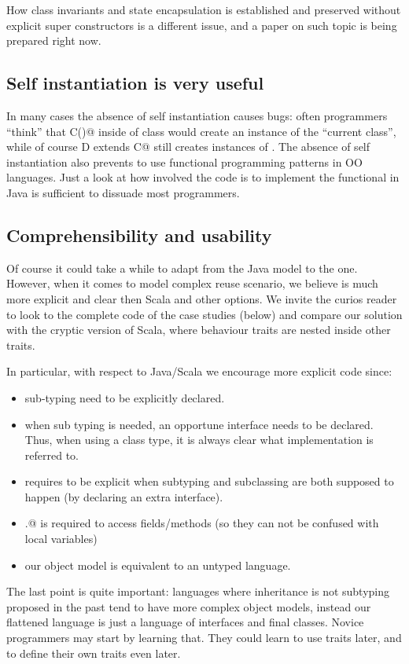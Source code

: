 How class invariants and state encapsulation is established and preserved without explicit super constructors is a different issue, and a paper on such topic is being prepared right now.

\subsection{Self instantiation is very useful}
In many cases the absence of self instantiation causes bugs: often programmers ``think'' that \Q@new C()@ inside of class \Q@C@ would create an instance of the ``current class'', while of course \Q@class D extends C@ still creates instances of \Q@C@.
The absence of self instantiation also prevents to use functional programming patterns in OO languages.
Just a look at how involved the code is to implement the functional \Q@Point@ in Java is sufficient to dissuade most programmers.

\subsection{Comprehensibility and usability}
Of course it could take a while to adapt from the Java model to the \name one. However, when it comes to model complex reuse scenario, we believe \name is much more explicit and clear then Scala and other options. We invite the curios reader to look to the complete code of the case studies (below) and compare our solution with the cryptic version of Scala, where behaviour traits are nested inside other traits.

In particular, with respect to Java/Scala we encourage more explicit code since:
\begin{itemize}
\item sub-typing need to be explicitly declared.
\item when sub typing is needed, an opportune interface needs to be declared. Thus, when using a class type, it is always clear what implementation is referred to.
\item \name requires to be explicit when subtyping and subclassing are both supposed to happen (by declaring an extra interface).
\item \Q@this.@ is required to access fields/methods (so they can not be confused with local variables)
\item our object model is equivalent to an untyped language.
\end{itemize}
The last point is quite important: languages where inheritance is not subtyping proposed in the past tend to have more complex object models, instead 
our flattened language is just a language of interfaces and final classes. Novice programmers may start by learning that. They could learn to use traits later, and to define their own traits even later.

